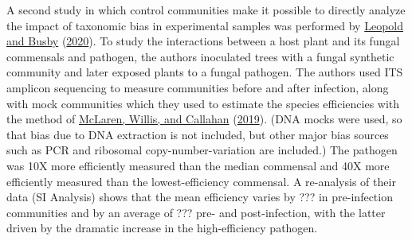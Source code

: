 \documentclass[
]{article}
\theoremstyle{definition}
\theoremstyle{definition}
\theoremstyle{definition}
\theoremstyle{definition}
\theoremstyle{remark}
\begin{document}
A second study in which control communities make it possible to directly analyze the impact of taxonomic bias in experimental samples was performed by \protect\hyperlink{ref-leopold2020host}{Leopold and Busby} (\protect\hyperlink{ref-leopold2020host}{2020}).
To study the interactions between a host plant and its fungal commensals and pathogen, the authors inoculated trees with a fungal synthetic community and later exposed plants to a fungal pathogen.
The authors used ITS amplicon sequencing to measure communities before and after infection, along with mock communities which they used to estimate the species efficiencies with the method of \protect\hyperlink{ref-mclaren2019cons}{McLaren, Willis, and Callahan} (\protect\hyperlink{ref-mclaren2019cons}{2019}).
(DNA mocks were used, so that bias due to DNA extraction is not included, but other major bias sources such as PCR and ribosomal copy-number-variation are included.) The pathogen was 10X more efficiently measured than the median commensal and 40X more efficiently measured than the lowest-efficiency commensal.
A re-analysis of their data (SI Analysis) shows that the mean efficiency varies by ??? in pre-infection communities and by an average of ??? pre- and post-infection, with the latter driven by the dramatic increase in the high-efficiency pathogen.
\end{document}
